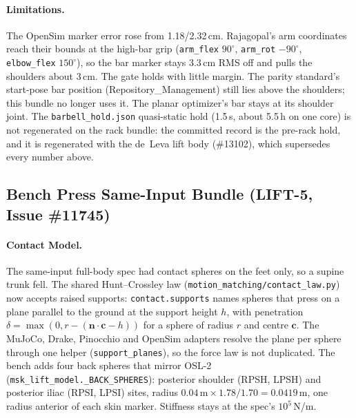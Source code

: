 \documentclass[11pt,a4paper]{article}
\begin{document}
\paragraph{Limitations.} The OpenSim marker error rose from 1.18/2.32\,cm.
Rajagopal's arm coordinates reach their bounds at the high-bar grip
(\texttt{arm\_flex} $90^\circ$, \texttt{arm\_rot} $-90^\circ$,
\texttt{elbow\_flex} $150^\circ$), so the bar marker stays 3.3\,cm RMS off
and pulls the shoulders about 3\,cm. The gate holds with little margin. The
parity standard's start-pose bar position (Repository\_Management) still
lies above the shoulders; this bundle no longer uses it. The planar
optimizer's bar stays at its shoulder joint. The \texttt{barbell\_hold.json}
quasi-static hold (1.5\,s, about 5.5\,h on one core) is not regenerated on the
rack bundle: the committed record is the pre-rack hold, and it is regenerated
with the de~Leva lift body (\#13102), which supersedes every number above.

\subsection{Bench Press Same-Input Bundle (LIFT-5, Issue \#11745)}
\paragraph{Contact Model.} The same-input full-body spec had contact spheres
on the feet only, so a supine trunk fell. The shared Hunt--Crossley law
(\texttt{motion\_matching/contact\_law.py}) now accepts raised supports:
\texttt{contact.supports} names spheres that press on a plane parallel to the
ground at the support height $h$, with penetration
$\delta = \max(0, r - (\mathbf{n}\cdot\mathbf{c} - h))$ for a sphere of radius $r$
and centre $\mathbf{c}$. The MuJoCo, Drake, Pinocchio and OpenSim adapters
resolve the plane per sphere through one helper (\texttt{support\_planes}),
so the force law is not duplicated. The bench adds four back spheres that
mirror OSL-2 (\texttt{msk\_lift\_model.\_BACK\_SPHERES}): posterior shoulder
(RPSH, LPSH) and posterior iliac (RPSI, LPSI) sites, radius
$0.04\,\mathrm{m}\times 1.78/1.70 = 0.0419$\,m, one radius anterior of each
skin marker. Stiffness stays at the spec's $10^5$\,N/m.
\end{document}
